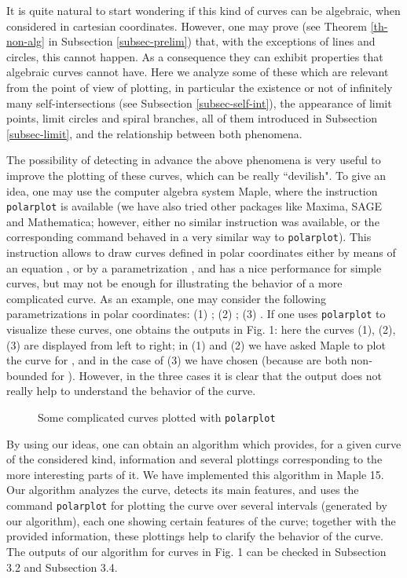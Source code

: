 \documentclass{elsart}
\begin{document}
It is quite natural to start wondering if this kind of curves can be algebraic, when considered in cartesian coordinates. However, one may prove (see Theorem \ref{th-non-alg} in Subsection \ref{subsec-prelim}) that, with the exceptions of lines and circles, this cannot happen. As a consequence they can exhibit properties that algebraic curves cannot have. Here we analyze some of these which are relevant from the point of view of plotting, in particular the existence or not of infinitely many self-intersections (see Subsection \ref{subsec-self-int}), the appearance of limit points, limit circles and spiral branches, all of them introduced in Subsection \ref{subsec-limit}, and the relationship between both phenomena.

The possibility of detecting in advance the above phenomena is very useful to improve the plotting of these curves, which can be really ``devilish". To give an idea, one may use the computer algebra system Maple, where the instruction {\tt polarplot} is available (we have also tried other packages like Maxima, SAGE and Mathematica; however, either no similar instruction was available, or the corresponding command behaved in a very similar way to {\tt polarplot}). This instruction allows to draw curves defined in polar coordinates either by means of an equation , or by a parametrization , and has a nice performance for simple curves, but may not be enough for illustrating the behavior of a more complicated curve. As an example, one may consider the following parametrizations in polar coordinates: (1) ; (2) ; (3) . If one uses {\tt polarplot} to visualize these curves, one obtains the outputs in Fig. 1: here the curves (1), (2), (3) are displayed from left to right; in (1) and (2) we have asked Maple to plot the curve for , and in the case of (3) we have chosen  (because  are both non-bounded for ). However, in the three cases it is clear that the output does not really help to understand the behavior of the curve.

\begin{figure}[ht]
\begin{center}
\centerline{}
\end{center}
\caption{Some complicated curves plotted with {\tt polarplot}}
\end{figure}

By using our ideas, one can obtain an algorithm which provides, for a given curve of the considered kind, information and several plottings corresponding to the more interesting parts of it. We have implemented this algorithm in Maple 15. Our algorithm analyzes the curve, detects its main features, and uses the command {\tt polarplot} for plotting the curve over several intervals (generated by our algorithm), each one showing certain features of the curve; together with the provided information, these plottings help to clarify the behavior of the curve. The outputs of our algorithm for curves in Fig. 1 can be checked in Subsection 3.2  and Subsection 3.4.
\end{document}
